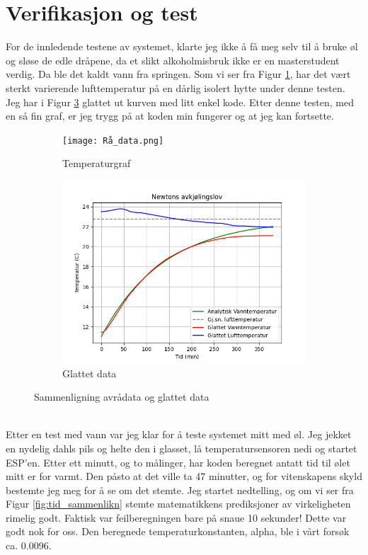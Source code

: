 \documentclass{article}
\begin{document}
\section{Verifikasjon og test}
\label{Verifikasjon og test}
For de innledende testene av systemet, klarte jeg ikke å få meg selv til å bruke øl og sløse de edle dråpene, da et slikt alkoholmisbruk ikke er en masterstudent verdig. Da ble det kaldt vann fra springen.
Som vi ser fra Figur \ref{fig:temperaturgraf}, har det vært sterkt varierende lufttemperatur på en dårlig isolert hytte under denne testen. Jeg har i Figur \ref{fig:glattet} glattet ut kurven med litt enkel kode. Etter denne testen, med en så fin graf, er jeg trygg på at koden min fungerer og at jeg kan fortsette.
\begin{figure}[h!]
    \centering
    \begin{subfigure}[b]{0.45\textwidth}
        \centering
        \texttt{[image: Rå\_data.png]}
        \caption{Temperaturgraf}
        \label{fig:temperaturgraf}
    \end{subfigure}
    \hfill
    \begin{subfigure}[b]{0.45\textwidth}
        \centering
        \includegraphics[width=\textwidth]{Glattet_data.png}
        \caption{Glattet data}
        \label{fig:glattet}
    \end{subfigure}
    \caption{Sammenligning avrådata og glattet data}
\end{figure}\\
Etter en test med vann var jeg klar for å teste systemet mitt med øl. Jeg jekket en nydelig dahls pils og helte den i glasset, lå temperatursensoren nedi og startet ESP'en. Etter ett minutt, og to målinger, har koden beregnet antatt tid til ølet mitt er for varmt. Den påsto at det ville ta 47 minutter, og for vitenskapens skyld bestemte jeg meg for å se om det stemte. Jeg startet nedtelling, og om vi ser fra Figur \ref{fig:tid_sammenlikn} stemte matematikkens prediksjoner av virkeligheten rimelig godt. Faktisk var feilberegningen bare på snaue 10 sekunder! Dette var godt nok for oss. Den beregnede temperaturkonstanten, alpha, ble i vårt forsøk ca. 0.0096.
\end{document}
